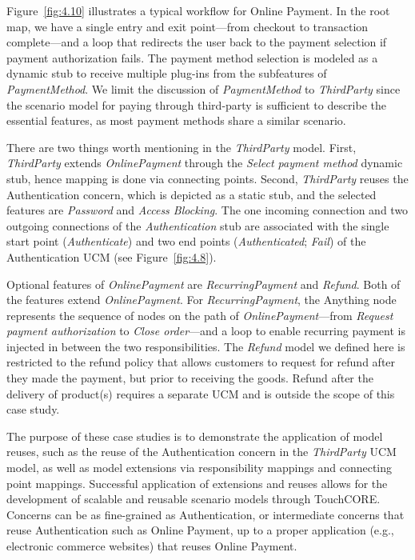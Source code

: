 Figure~\ref{fig:4.10} illustrates a typical workflow for Online Payment. In the root map, we have a single entry and exit point---from checkout to transaction complete---and a loop that redirects the user back to the payment selection if payment authorization fails. The payment method selection is modeled as a dynamic stub to receive multiple plug-ins from the subfeatures of \emph{PaymentMethod}. We limit the discussion of \emph{PaymentMethod} to \emph{ThirdParty} since the scenario model for paying through third-party is sufficient to describe the essential features, as most payment methods share a similar scenario.

There are two things worth mentioning in the \emph{ThirdParty} model. First, \emph{ThirdParty} extends \emph{OnlinePayment} through the \emph{Select payment method} dynamic stub, hence mapping is done via connecting points. Second, \emph{ThirdParty} reuses the Authentication concern, which is depicted as a static stub, and the selected features are \emph{Password} and \emph{Access Blocking}. The one incoming connection and two outgoing connections of the \emph{Authentication} stub are associated with the single start point (\emph{Authenticate}) and two end points (\emph{Authenticated}; \emph{Fail}) of the Authentication UCM (see Figure~\ref{fig:4.8}).

Optional features of \emph{OnlinePayment} are \emph{RecurringPayment} and \emph{Refund}. Both of the features extend \emph{OnlinePayment}. For \emph{RecurringPayment}, the {\cls Anything} node represents the sequence of nodes on the path of \emph{OnlinePayment}---from \emph{Request payment authorization} to \emph{Close order}---and a loop to enable recurring payment is injected in between the two responsibilities. The \emph{Refund} model we defined here is restricted to the refund policy that allows customers to request for refund after they made the payment, but prior to receiving the goods. Refund after the delivery of product(s) requires a separate UCM and is outside the scope of this case study.

The purpose of these case studies is to demonstrate the application of model reuses, such as the reuse of the Authentication concern in the \emph{ThirdParty} UCM model, as well as model extensions via responsibility mappings and connecting point mappings. Successful application of extensions and reuses allows for the development of scalable and reusable scenario models through TouchCORE. Concerns can be as fine-grained as Authentication, or intermediate concerns that reuse Authentication such as Online Payment, up to a proper application (e.g., electronic commerce websites) that reuses Online Payment.

